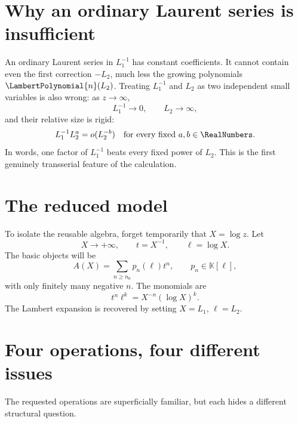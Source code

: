 \documentclass[11pt,oneside,openany]{book}
\newcommand{\K}{\mathbb{K}}
\begin{document}
\section{Why an ordinary Laurent series is insufficient}
An ordinary Laurent series in \(L_1^{-1}\) has constant coefficients.  It
cannot contain even the first correction \(-L_2\), much less the growing
polynomials \(\LambertPolynomial{n}(L_2)\).  Treating \(L_1^{-1}\) and \(L_2\) as two independent
small variables is also wrong: as \(z\to\infty\),
\[
  L_1^{-1}\to0,
  \qquad
  L_2\to\infty,
\]
and their relative size is rigid:
\begin{equation}\label{eq:scalehierarchyW}
  L_1^{-1}L_2^a=o(L_2^{-b})
  \quad\text{for every fixed }a,b\in\RealNumbers.
\end{equation}
In words, one factor of \(L_1^{-1}\) beats every fixed power of \(L_2\).  This
is the first genuinely transserial feature of the calculation.

\section{The reduced model}
To isolate the reusable algebra, forget temporarily that \(X=\log z\).  Let
\[
  X\to+\infty,
  \qquad
  t=X^{-1},
  \qquad
  \ell=\log X.
\]
The basic objects will be
\begin{equation}\label{eq:basicform}
  A(X)=\sum_{n\geq n_0}p_n(\ell)t^n,
  \qquad p_n\in\K[\ell],
\end{equation}
with only finitely many negative \(n\).  The monomials are
\[
  t^n\ell^k=X^{-n}(\log X)^k.
\]
The Lambert expansion is recovered by setting \(X=L_1\), \(\ell=L_2\).

\section{Four operations, four different issues}
The requested operations are superficially familiar, but each hides a
different structural question.
\end{document}
